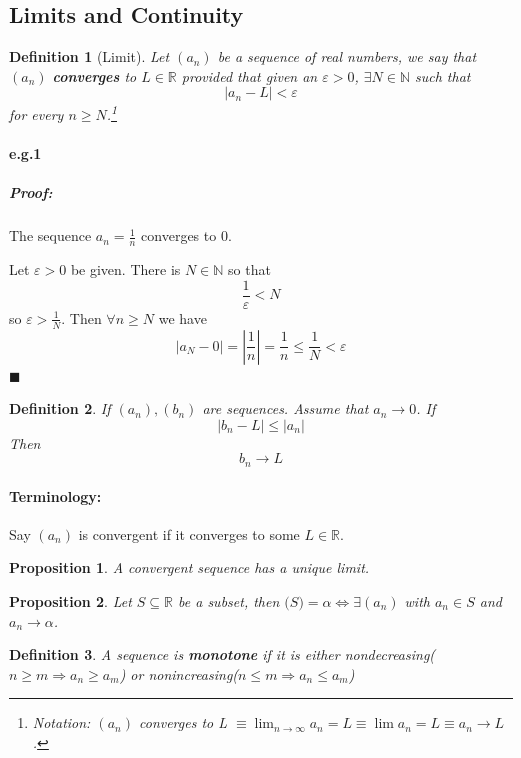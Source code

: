 \documentclass[12pt]{article}
\newtheorem{definition}{Definition}[subsection]
\newtheorem{proposition}{Proposition}[subsection]
\begin{document}
		\subsection{Limits and Continuity}
		
		\begin{definition}[Limit]
			Let $(a_n)$ be a sequence of real numbers, we say that $(a_n)$ \textbf{converges} to $L \in \mathbb{R}$ provided that given an $\varepsilon > 0$, $\exists N \in \mathbb{N}$ such that
			\[|a_n - L| < \varepsilon\] 
			for every $n \geq N$.\footnote{Notation: $(a_n)$ converges to L $\equiv \lim_{n\rightarrow\infty}a_n = L \equiv \lim a_n = L \equiv a_n \rightarrow L$.}
		\end{definition}
		
		\paragraph{e.g.1}
			\subparagraph{Proof:}
		The sequence $a_n = \frac{1}{n}$ converges to $0$.
		
		Let $\varepsilon > 0$ be given. There is $N \in \mathbb{N}$ so that \[\frac{1}{\varepsilon} < N\]
		so $\varepsilon > \frac{1}{N}$. Then $\forall n \geq N$ we have
		\[|a_N - 0| = |\frac{1}{n}| = \frac{1}{n} \leq \frac{1}{N} < \varepsilon\]
		$\blacksquare$
		
		\begin{definition}
			If $(a_n), (b_n)$ are sequences. Assume that $a_n \rightarrow 0$. If
				\[|b_n - L| \leq |a_n|\]
			Then
				\[b_n \rightarrow L\]
		\end{definition}
		\paragraph{Terminology:} Say $(a_n)$ is convergent if it converges to some $L \in \mathbb{R}$.
		
		\begin{proposition}
			A convergent sequence has a unique limit.
		\end{proposition}
		
		\begin{proposition}
			Let $S \subseteq \mathbb{R}$ be a subset, then $\mathrm(S) = \alpha \Leftrightarrow \exists (a_n)$ with $a_n \in S$ and $a_n \rightarrow \alpha$.
		\end{proposition}
		
		\begin{definition}
			A sequence is \textbf{monotone} if it is either nondecreasing($n \geq m \Rightarrow a_n \geq a_m$) or nonincreasing($n \leq m \Rightarrow a_n \leq a_m$)
		\end{definition}
		
\end{document}
